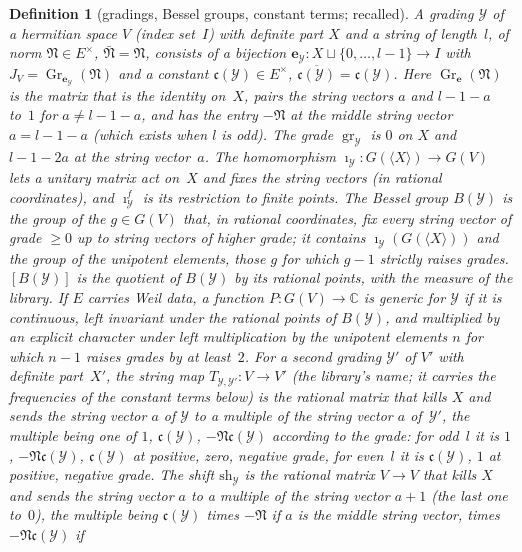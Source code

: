 \documentclass[11pt,a4paper]{article}
\newcommand{\kw}[1]{\emph{#1}}
\newcommand{\m}[1]{\mbox{$#1$}}        %
\theoremstyle{plainx}
\theoremstyle{uprightx}
\newtheorem{definition}[theorem]{Definition}
\newcommand{\CC}{\mathbb{C}}
\newcommand{\cj}[1]{\overline{#1}}
\newcommand{\cY}{\mathcal{Y}}
\newcommand{\St}[1]{\langle #1\rangle}          %
\newcommand{\gr}[1]{\operatorname{gr}_{#1}}     %
\newcommand{\Tm}[2]{T_{#1,#2}}                  %
\newcommand{\shf}[1]{\mathrm{sh}_{#1}}          %
\newcommand{\inX}[1]{\imath_{#1}}               %
\newcommand{\inXf}[1]{\imath^{f}_{#1}}
\newcommand{\fc}[1]{\mathfrak{c}(#1)}           %
\newcommand{\Gg}[1]{G(#1)}
\newcommand{\Bes}[1]{B(#1)}
\newcommand{\qB}[1]{[B(#1)]}
\newcommand{\gram}[2]{\operatorname{Gr}_{#1}(#2)}       %
\begin{document}
\begin{definition}[gradings, Bessel groups, constant terms; recalled]\label{d:grading}
A \kw{grading} $\cY$ of a hermitian space $V$ (index set~$I$) with \kw{definite part} $X$ and a string of
length~$l$, of \kw{norm} \m{\mathfrak{N}\in E^{\times}}, \m{\bar{\mathfrak{N}}=\mathfrak{N}}, consists of a bijection
$\mathbf{e}_{\cY}\colon X\sqcup\{0,\dots,l-1\}\to I$ with \m{J_V=\gram{\mathbf{e}_{\cY}}{\mathfrak{N}}} and a constant
\m{\fc{\cY}\in E^{\times}}, \m{\cj{\fc{\cY}}=\fc{\cY}}. Here \m{\gram{\mathbf{e}}{\mathfrak{N}}} is the matrix that is the identity
on~$X$, pairs the string vectors $a$ and \m{l-1-a} to~$1$ for \m{a\ne l-1-a}, and has the entry $-\mathfrak{N}$ at the middle
string vector \m{a=l-1-a} (which exists when $l$ is odd). The \kw{grade} $\gr{\cY}$ is $0$ on $X$ and \m{l-1-2a}
at the string vector~$a$. The homomorphism \m{\inX{\cY}\colon\Gg{\St{X}}\to\Gg{V}} lets a unitary matrix act on~$X$
and fixes the string vectors (in rational coordinates), and $\inXf{\cY}$ is its restriction to finite points. The
\kw{Bessel group} $\Bes{\cY}$ is the group of the \m{g\in\Gg{V}} that, in rational coordinates, fix every string
vector of grade \m{\ge0} up to string vectors of higher grade; it contains $\inX{\cY}(\Gg{\St{X}})$ and the group
of the \kw{unipotent} elements, those $g$ for which \m{g-1} strictly raises grades. \m{\qB{\cY}} is the quotient of
$\Bes{\cY}$ by its rational points, with the measure of the library. If $E$ carries Weil data, a function
\m{P\colon\Gg{V}\to\CC} is \kw{generic} for $\cY$ if it is continuous, left invariant under the rational points of
$\Bes{\cY}$, and multiplied by an explicit character under left multiplication by the unipotent elements $n$ for
which \m{n-1} raises grades by at least~$2$. For a second grading $\cY'$ of $V'$ with definite part~$X'$, the
\kw{string map} \m{\Tm{\cY}{\cY'}\colon V\to V'} (the library's name; it carries the frequencies of the constant
terms below) is the rational matrix that kills $X$ and sends the string vector
$a$ of $\cY$ to a multiple of the string vector $a$ of~$\cY'$, the multiple being one of $1$, $\fc{\cY}$,
\m{-\mathfrak{N}\fc{\cY}} according to the grade: for odd~$l$ it is $1$, \m{-\mathfrak{N}\fc{\cY}}, $\fc{\cY}$ at positive, zero, negative
grade, for even~$l$ it is $\fc{\cY}$, $1$ at positive, negative grade. The \kw{shift} $\shf{\cY}$ is the rational
matrix \m{V\to V} that kills $X$ and sends the string vector $a$ to a multiple of the string vector \m{a+1} (the last
one to~$0$), the multiple being $\fc{\cY}$ times \m{-\mathfrak{N}} if $a$ is the middle string vector, times \m{-\mathfrak{N}\fc{\cY}} if

\end{definition}
\end{document}
